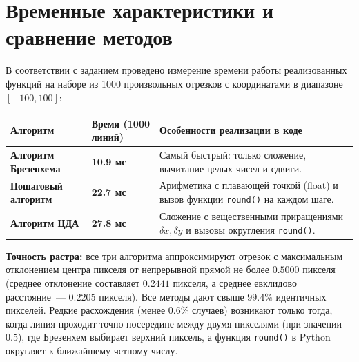 \documentclass[11pt,a4paper]{article}
\begin{document}
\section*{Временные характеристики и сравнение методов}
В соответствии с заданием проведено измерение времени работы реализованных функций на наборе из 1000 произвольных отрезков с координатами в диапазоне $[-100, 100]$:

\begin{table}[H]
\centering
\begin{tabular}{@{}llp{8.5cm}@{}}
\toprule
\textbf{Алгоритм} & \textbf{Время (1000 линий)} & \textbf{Особенности реализации в коде} \\
\midrule
\textbf{Алгоритм Брезенхема} & \textbf{10.9 мс} & Самый быстрый: только сложение, вычитание целых чисел и сдвиги. \\
\textbf{Пошаговый алгоритм}  & \textbf{22.7 мс} & Арифметика с плавающей точкой (float) и вызов функции \texttt{round()} на каждом шаге. \\
\textbf{Алгоритм ЦДА}        & \textbf{27.8 мс} & Сложение с вещественными приращениями $\delta x, \delta y$ и вызовы округления \texttt{round()}. \\
\bottomrule
\end{tabular}
\end{table}

\textbf{Точность растра:} все три алгоритма аппроксимируют отрезок с максимальным отклонением центра пикселя от непрерывной прямой не более $0.5000$ пикселя (среднее отклонение составляет $0.2441$ пикселя, а среднее евклидово расстояние~--- $0.2205$ пикселя). Все методы дают свыше $99.4\%$ идентичных пикселей. Редкие расхождения (менее $0.6\%$ случаев) возникают только тогда, когда линия проходит точно посередине между двумя пикселями (при значении $0.5$), где Брезенхем выбирает верхний пиксель, а функция \texttt{round()} в Python округляет к ближайшему четному числу.
\end{document}
